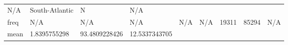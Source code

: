 \begin{longtable}[]{@{}lllllllll@{}}
\begin{minipage}[t]{0.09\columnwidth}
N/A\strut
\end{minipage} & \begin{minipage}[t]{0.09\columnwidth}\raggedright
South-Atlantic\strut
\end{minipage} & \begin{minipage}[t]{0.08\columnwidth}\raggedright
N\strut
\end{minipage} & \begin{minipage}[t]{0.11\columnwidth}\raggedright
N/A\strut
\end{minipage}\tabularnewline
\begin{minipage}[t]{0.05\columnwidth}\raggedright
freq\strut
\end{minipage} & \begin{minipage}[t]{0.08\columnwidth}\raggedright
N/A\strut
\end{minipage} & \begin{minipage}[t]{0.09\columnwidth}\raggedright
N/A\strut
\end{minipage} & \begin{minipage}[t]{0.09\columnwidth}\raggedright
N/A\strut
\end{minipage} & \begin{minipage}[t]{0.08\columnwidth}\raggedright
N/A\strut
\end{minipage} & \begin{minipage}[t]{0.09\columnwidth}\raggedright
N/A\strut
\end{minipage} & \begin{minipage}[t]{0.09\columnwidth}\raggedright
19311\strut
\end{minipage} & \begin{minipage}[t]{0.08\columnwidth}\raggedright
85294\strut
\end{minipage} & \begin{minipage}[t]{0.11\columnwidth}\raggedright
N/A\strut
\end{minipage}\tabularnewline
\begin{minipage}[t]{0.05\columnwidth}\raggedright
mean\strut
\end{minipage} & \begin{minipage}[t]{0.08\columnwidth}\raggedright
1.8395755298\strut
\end{minipage} & \begin{minipage}[t]{0.09\columnwidth}\raggedright
93.4809228426\strut
\end{minipage} & \begin{minipage}[t]{0.09\columnwidth}\raggedright
12.5337343705\strut
\end{minipage} & \begin{minipage}[t]{0.08\columnwidth}\raggedright

\end{minipage}
\end{longtable}
